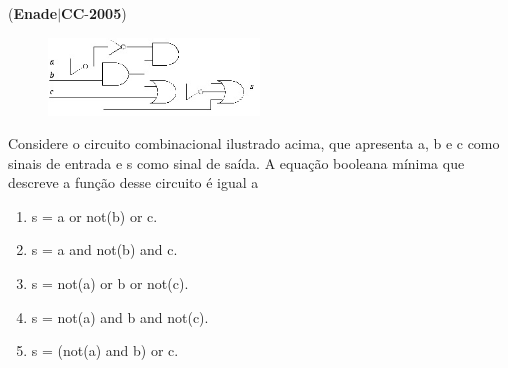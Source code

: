 \documentclass{exam}
\begin{document}
\begin{questions}
\begin{enumerate}[label=\alph*)]
	\end{enumerate}

\question (\textbf{Enade}$|$\textbf{CC}-\textbf{2005}) \begin{figure}[H]
	\begin{center}
		\includegraphics[width=0.5\textwidth]{CIENCIA_DA_COMPUTACAO_Prova2005-utf8_figuras/fig-0029.jpg}
	\end{center}
\end{figure}
Considere o circuito combinacional ilustrado acima, que apresenta
a, b e c como sinais de entrada e s como sinal de saída. A equação
booleana mínima que descreve a função desse circuito é igual a
	\begin{enumerate}[label=\alph*)]
		\item  s = a or not(b) or c.
		\item  s = a and not(b) and c.
		\item  s = not(a) or b or not(c).
		\item  s = not(a) and b and not(c).
		\item  s = (not(a) and b) or c.

	\end{enumerate}


\end{questions}
\end{document}
